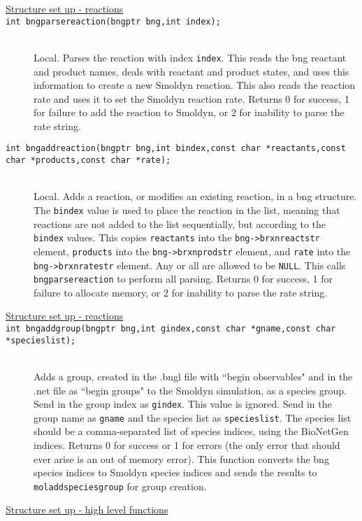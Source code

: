 \documentclass {book}
\newcommand {\ttt} {\texttt}
\begin{document}
\begin{description}
\item[\underline{Structure set up - reactions}]

\item[\ttt{int bngparsereaction(bngptr bng,int index);}]
\hfill \\
Local. Parses the reaction with index \ttt{index}. This reads the bng reactant and product names, deals with reactant and product states, and uses this information to create a new Smoldyn reaction. This also reads the reaction rate and uses it to set the Smoldyn reaction rate. Returns 0 for success, 1 for failure to add the reaction to Smoldyn, or 2 for inability to parse the rate string.

\item[\ttt{int bngaddreaction(bngptr bng,int bindex,const char *reactants,const char *products,const char *rate);}]
\hfill \\
Local. Adds a reaction, or modifies an existing reaction, in a bng structure. The \ttt{bindex} value is used to place the reaction in the list, meaning that reactions are not added to the list sequentially, but according to the \ttt{bindex} values. This copies \ttt{reactants} into the \ttt{bng->brxnreactstr} element, \ttt{products} into the \ttt{bng->brxnprodstr} element, and \ttt{rate} into the \ttt{bng->brxnratestr} element. Any or all are allowed to be \ttt{NULL}. This calls \ttt{bngparsereaction} to perform all parsing. Returns 0 for success, 1 for failure to allocate memory, or 2 for inability to parse the rate string.

\item[\underline{Structure set up - reactions}]

\item[\ttt{int bngaddgroup(bngptr bng,int gindex,const char *gname,const char *specieslist);}]
\hfill \\
Adds a group, created in the .bngl file with ``begin observables" and in the .net file as ``begin groups" to the Smoldyn simulation, as a species group. Send in the group index as \ttt{gindex}. This value is ignored. Send in the group name as \ttt{gname} and the species list as \ttt{specieslist}. The species list should be a comma-separated list of species indices, using the BioNetGen indices. Returns 0 for success or 1 for errors (the only error that should ever arise is an out of memory error). This function converts the bng species indices to Smoldyn species indices and sends the results to \ttt{moladdspeciesgroup} for group creation.

\item[\underline{Structure set up - high level functions}]


\end{description}
\end{document}
